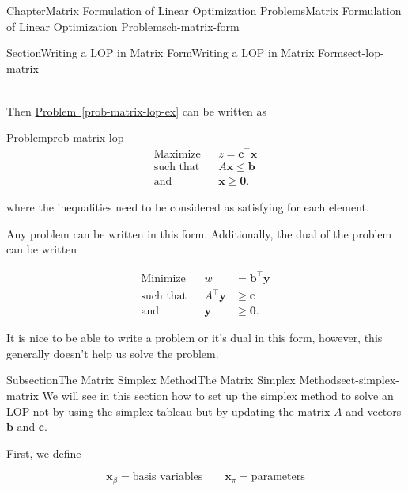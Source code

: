 \documentclass[oneside,10pt,]{book}
\newcommand{\xreffont}{\relax}
\numberwithin{equation}{section}
\newcommand{\amp}{&}
\begin{document}
\begin{chapterptx}{Chapter}{Matrix Formulation of Linear Optimization Problems}{}{Matrix Formulation of Linear Optimization Problems}{}{}{ch-matrix-form}
\begin{sectionptx}{Section}{Writing a LOP in Matrix Form}{}{Writing a LOP in Matrix Form}{}{}{sect-lop-matrix}
\begin{introduction}{}
\begin{align*}
\end{align*}
%
\par
Then \hyperref[prob-matrix-lop-ex]{Problem~{\xreffont\ref{prob-matrix-lop-ex}}} can be written as%
\begin{problem}{Problem}{}{prob-matrix-lop}%
%
\begin{equation*}
\begin{aligned} \text{Maximize} \amp \amp z = \boldsymbol{c}^{\intercal} \boldsymbol{x}  \\ \text{such that} \amp \amp A \boldsymbol{x} \leq \boldsymbol{b} \\ \text{and} \amp \amp \boldsymbol{x} \geq \boldsymbol{0}.
\end{aligned}
\end{equation*}
%
\end{problem}
where the inequalities need to be considered as satisfying for each element.%
\par
Any problem can be written in this form. Additionally, the dual of the problem can be written%
\par
%
\begin{equation*}
\begin{aligned} \text{Minimize} \amp \amp w \amp = \boldsymbol{b}^{\intercal} \boldsymbol{y} \\ \text{such that} \amp \amp A^{\intercal} \boldsymbol{y} \amp \geq \boldsymbol{c} \\ \text{and} \amp \amp \boldsymbol{y} \amp \geq \boldsymbol{0}.
\end{aligned}
\end{equation*}
%
\par
It is nice to be able to write a problem or it's dual in this form, however, this generally doesn't help us solve the problem.%
\end{introduction}%
%
%
\typeout{************************************************}
\typeout{************************************************}
%
\begin{subsectionptx}{Subsection}{The Matrix Simplex Method}{}{The Matrix Simplex Method}{}{}{sect-simplex-matrix}
We will see in this section how to set up the simplex method to solve an LOP not by using the simplex tableau but by updating the matrix \(A\) and vectors \(\boldsymbol{b}\) and \(\boldsymbol{c}\).%
\par
First, we define%
\par
%
\begin{equation*}
\boldsymbol{x}_{\beta} = \text{basis variables} \qquad \boldsymbol{x}_{\pi} = \text{parameters}

\end{equation*}
\end{subsectionptx}
\end{sectionptx}
\end{chapterptx}
\end{document}
